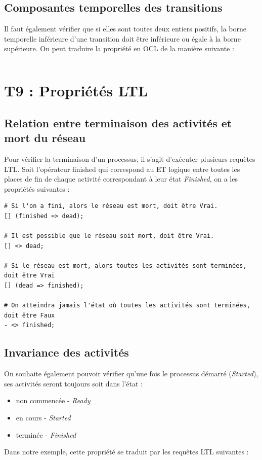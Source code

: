 \documentclass{report}
\begin{document}
\subsection{Composantes temporelles des transitions}

Il faut également vérifier que si elles sont toutes deux entiers positifs, la borne temporelle inférieure d'une transition doit être inférieure ou égale à la borne supérieure. On peut traduire la propriété en OCL de la manière suivante :

\begin{verbatim}
\end{verbatim}

\section{T9 : Propriétés LTL}

\subsection{Relation entre terminaison des activités et mort du réseau}

Pour vérifier la terminaison d'un processus, il s'agit d'exécuter plusieurs requètes LTL.
Soit l'opérateur finished qui correspond au ET logique entre toutes les places de fin de chaque activité correspondant à leur état \textit{Finished}, on a les propriétés suivantes :\\

\begin{verbatim}
# Si l'on a fini, alors le réseau est mort, doit être Vrai.
[] (finished => dead);

# Il est possible que le réseau soit mort, doit être Vrai.
[] <> dead;

# Si le réseau est mort, alors toutes les activités sont terminées, doit être Vrai
[] (dead => finished);

# On atteindra jamais l'état où toutes les activités sont terminées, doit être Faux
- <> finished;
\end{verbatim}

\subsection{Invariance des activités}

On souhaite également pouvoir vérifier qu'une fois le processus démarré (\textit{Started}), ses activités seront toujours soit dans l'état :
\begin{itemize}
\item non commencée - \textit{Ready}
\item en cours - \textit{Started}
\item terminée - \textit{Finished}
\end{itemize}
Dans notre exemple, cette propriété se traduit par les requêtes LTL suivantes :
\end{document}
